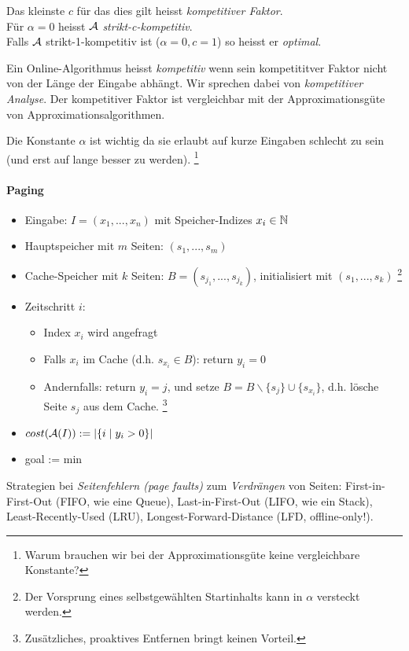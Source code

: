Das kleinste $c$ für das dies gilt heisst \emph{kompetitiver Faktor}. \\
Für $\alpha = 0$ heisst $\mathcal{A}$ \emph{strikt-c-kompetitiv}. \\
Falls $\mathcal{A}$ strikt-1-kompetitiv ist ($\alpha = 0, c = 1$) so heisst er \emph{optimal}.

Ein Online-Algorithmus heisst \emph{kompetitiv} wenn sein kompetititver Faktor nicht von der
Länge der Eingabe abhängt.
Wir sprechen dabei von \emph{kompetitiver Analyse}.
Der kompetitiver Faktor ist vergleichbar mit der Approximationsgüte von Approximationsalgorithmen.

Die Konstante $\alpha$ ist wichtig da sie erlaubt auf kurze Eingaben schlecht zu sein
(und erst auf lange besser zu werden).
\footnote{Warum brauchen wir bei der Approximationsgüte keine vergleichbare Konstante?}

\paragraph{Paging}
\begin{itemize}
    \item Eingabe: $ I = (x_1, ..., x_n)$ mit Speicher-Indizes $x_i \in \mathbb{N}$
    \item Hauptspeicher mit $m$ Seiten: $ (s_1, ..., s_m) $
    \item Cache-Speicher mit $k$ Seiten: $ B = (s_{j_1}, ..., s_{j_k}) $, initialisiert mit $ (s_1, ..., s_k) $
        \footnote{Der Vorsprung eines selbstgewählten Startinhalts kann in $\alpha$ versteckt werden.}
    \item Zeitschritt $i$:
    \begin{itemize}
        \item Index $x_i$ wird angefragt
        \item Falls $x_i$ im Cache (d.h. $s_{x_i} \in B$): return $y_i=0$
        \item Andernfalls: return $y_i=j$, und setze $B = B \backslash  \{s_j\} \cup \{s_{x_i}\} $,
            d.h. lösche Seite $s_j$ aus dem Cache.
            \footnote{Zusätzliches, proaktives Entfernen bringt keinen Vorteil.}
    \end{itemize}
    \item $ cost(\mathcal{A}(I)) := \vert \{ i \; | \; y_i > 0 \} \vert $
    \item goal := min
\end{itemize}

Strategien bei \emph{Seitenfehlern (page faults)} zum \emph{Verdrängen} von Seiten:
First-in-First-Out (FIFO, wie eine Queue),
Last-in-First-Out (LIFO, wie ein Stack),
Least-Recently-Used (LRU),
Longest-Forward-Distance (LFD, offline-only!).

